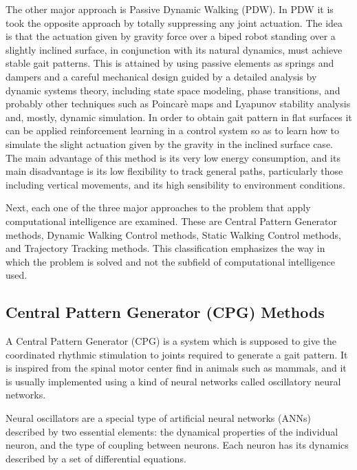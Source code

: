The other major approach is Passive Dynamic Walking (PDW). In PDW it
is took the opposite approach by totally suppressing any joint
actuation. The idea is that the actuation given by gravity force over
a biped robot standing over a slightly inclined surface, in
conjunction with its natural dynamics, must achieve stable gait
patterns. This is attained by using passive elements as springs and
dampers and a careful mechanical design guided by a detailed analysis
by dynamic systems theory, including state space modeling, phase
transitions, and probably other techniques such as Poincarè maps and
Lyapunov stability analysis and, mostly, dynamic simulation. In order
to obtain gait pattern in flat surfaces it can be applied
reinforcement learning in a control system so as to learn how to
simulate the slight actuation given by the gravity in the inclined
surface case. The main advantage of this method is its very low energy
consumption, and its main disadvantage is its low flexibility to track
general paths, particularly those including vertical movements, and
its high sensibility to environment conditions.

Next, each one of the three major approaches to the problem that apply
computational intelligence are examined. These are Central Pattern
Generator methods, Dynamic Walking Control methods, Static Walking
Control methods, and Trajectory Tracking methods. This classification
emphasizes the way in which the problem is solved and not the subfield
of computational intelligence used.

\subsection{Central Pattern Generator (CPG) Methods}
A Central Pattern Generator (CPG) is a system which is supposed to
give the coordinated rhythmic stimulation to joints required to
generate a gait pattern. It is inspired from the spinal motor center
find in animals such as mammals, and it is usually implemented using a
kind of neural networks called oscillatory neural networks.


Neural oscillators are a special type of artificial neural networks
(ANNs) described by two essential elements: the dynamical properties
of the individual neuron, and the type of coupling between
neurons. Each neuron has its dynamics described by a set of
differential equations. 



